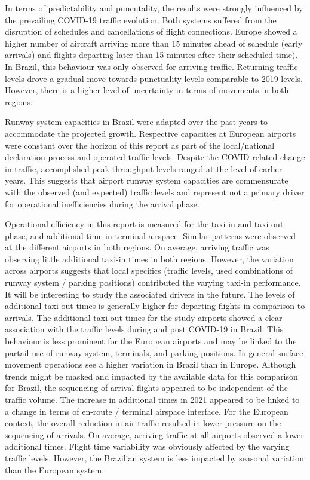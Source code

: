 \documentclass[
  a4paper,
  DIV=11,
  numbers=noendperiod]{scrreprt}
\begin{document}
In terms of predictability and puncutality, the results were strongly
influenced by the prevailing COVID-19 traffic evolution. Both systems
suffered from the disruption of schedules and cancellations of flight
connections. Europe showed a higher number of aircraft arriving more
than 15 minutes ahead of schedule (early arrivals) and flights departing
later than 15 minutes after their scheduled time). In Brazil, this
behaviour was only observed for arriving traffic. Returning traffic
levels drove a gradual move towards punctuality levels comparable to
2019 levels. However, there is a higher level of uncertainty in terms of
movements in both regions.

Runway system capacities in Brazil were adapted over the past years to
accommodate the projected growth. Respective capacities at European
airports were constant over the horizon of this report as part of the
local/national declaration process and operated traffic levels. Despite
the COVID-related change in traffic, accomplished peak throughput levels
ranged at the level of earlier years. This suggests that airport runway
system capacities are commensurate with the observed (and expected)
traffic levels and represent not a primary driver for operational
inefficiencies during the arrival phase.

Operational efficiency in this report is measured for the taxi-in and
taxi-out phase, and additional time in terminal airspace. Similar
patterns were observed at the different airports in both regions. On
average, arriving traffic was observing little additional taxi-in times
in both regions. However, the variation across airports suggests that
local specifics (traffic levels, used combinations of runway system /
parking positions) contributed the varying taxi-in performance. It will
be interesting to study the associated drivers in the future. The levels
of additional taxi-out times is generally higher for departing flights
in comparison to arrivals. The additional taxi-out times for the study
airports showed a clear association with the traffic levels during and
post COVID-19 in Brazil. This behaviour is less prominent for the
European airports and may be linked to the partail use of runway system,
terminals, and parking positions. In general surface movement operations
see a higher variation in Brazil than in Europe. Although trends might
be masked and impacted by the available data for this comparison for
Brazil, the sequencing of arrival flights appeared to be independent of
the traffic volume. The increase in additional times in 2021 appeared to
be linked to a change in terms of en-route / terminal airspace
interface. For the European context, the overall reduction in air
traffic resulted in lower pressure on the sequencing of arrivals. On
average, arriving traffic at all airports observed a lower additional
times. Flight time variability was obviously affected by the varying
traffic levels. However, the Brazilian system is less impacted by
seasonal variation than the European system.
\end{document}
